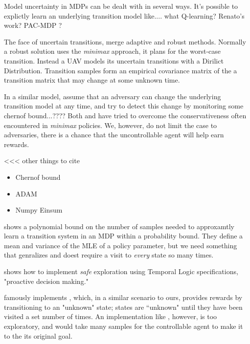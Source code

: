     Model uncertainty in \ac{MDP}s can be dealt with in several ways. It's possible to explictly learn an underlying
    transition model like.... what Q-learning? Renato's work? PAC-MDP \cite{fu2014probablyu}?

    The face of uncertain transitions, \cite{bertuccelli2012robust} merge adaptive and robust methods. Normally a robust
    solution uses the \textit{minimax} approach, it plans for the worst-case transition. Instead a UAV models its
    uncertain transitions with a Dirilict Distribution. Transition samples form an empirical covariance matrix of the a
    transition matrix that may change at some unknown time.

    In a similar model, \cite{lim2013reinforcement} assume that an adversary can change the underlying transition model
    at any time, and try to detect this change by monitoring some chernof bound...???? Both \cite{lim2013reinforcement}
    and \cite{bertuccelli2012robust} have tried to overcome the conservativeness often encountered in \textit{minimax}
    policies. We, however, do not limit the case to adversaries, there is a chance that the uncontrollable agent will
    help earn rewards.

    \brk
    <<< other things to cite
    \begin{itemize}
            \item Chernof bound 
            \item ADAM
            \item Numpy Einsum
    \end{itemize}
    \brk
    \cite{Fu-RSS-14} shows a polynomial bound on the number of samples needed to approxamtly learn a transition system
    in an MDP within a probability bound. They define a mean and variance of the \ac{MLE} of a policy parameter, but we
    need something that genralizes and doest require a visit to \textit{every} state so many times.

    \cite{chinchali2017multi} shows how to implement \textit{safe} exploration using Temporal Logic specifications,
    "proactive decision making."


    \cite{brafman2002r} famously implements \Rmax, which, in a similar scenario to ours, provides rewards by
    transitioning to an "unknown" state; states are ``unknown" until they have been visited a set number of times.  An
    implementation like \Rmax, however, is too exploratory, and would take many samples for the controllable agent to
    make it to the its original goal.

